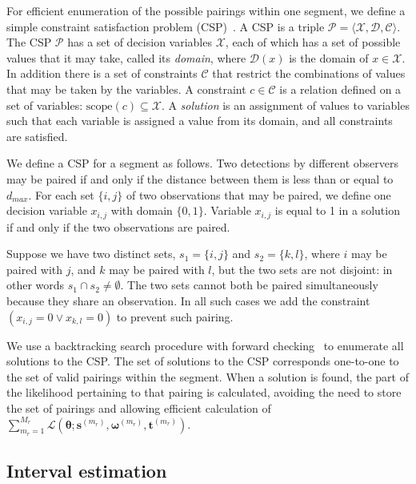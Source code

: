 \documentclass[useAMS, usenatbib, referee]{biom}\usepackage[]{graphicx}\usepackage[]{color}
\begin{document}
For efficient enumeration of the possible pairings within one segment, we define a simple constraint satisfaction problem (CSP)~\cite[Chapter 6]{russell-norvig-aima3}. A CSP is a triple \(\mathcal{P}=\langle \mathcal{X}, \mathcal{D}, \mathcal{C} \rangle\).  The CSP \(\mathcal{P}\) has a set of decision variables \(\mathcal{X}\), each of which has a set of possible values that it may take, called its \textit{domain}, where \(\mathcal{D}(x)\) is the domain of \(x \in \mathcal{X}\). In addition there is a set of constraints \(\mathcal{C}\) that restrict the combinations of values that may be taken by the variables. A constraint \(c\in \mathcal{C}\) is a relation defined on a set of variables: \(\mathrm{scope}(c)\subseteq \mathcal{X}\). A \textit{solution} is an assignment of values to variables such that each variable is assigned a value from its domain, and all constraints are satisfied.

We define a CSP for a segment as follows. Two detections by different observers may be paired if and only if the distance between them is less than or equal to \(d_{max}\). For each set \(\{i,j\}\) of two observations that may be paired, we define one decision variable \(x_{i,j}\) with domain \(\{0,1\}\). Variable \(x_{i,j}\) is equal to 1 in a solution if and only if the two observations are paired.

Suppose we have two distinct sets, \(s_1=\{i,j\}\) and \(s_2=\{k,l\}\), where  \(i\) may be paired with \(j\), and \(k\) may be paired with \(l\), but the two sets are not disjoint: in other words \(s_1 \cap s_2 \ne \emptyset\). The two sets cannot both be paired simultaneously because they share an observation. In all such cases we add the constraint \((x_{i,j}=0 \vee x_{k,l}=0)\) to prevent such pairing.

We use a backtracking search procedure with forward checking~\cite[Chapter 6]{russell-norvig-aima3} to enumerate all solutions to the CSP. The set of solutions to the CSP corresponds one-to-one to the set of valid pairings within the segment. When a solution is found, the part of the likelihood pertaining to that pairing is calculated, avoiding the need to store the set of pairings and allowing efficient calculation of $\sum_{m_r=1}^{M_r}\mathcal{L}\left(\bm{\theta};\bm{s}^{(m_r)},\bm{\omega}^{(m_r)},\bm{t}^{(m_r)}\right)$.

\subsection{Interval estimation}
\label{sec:ci}
\end{document}
